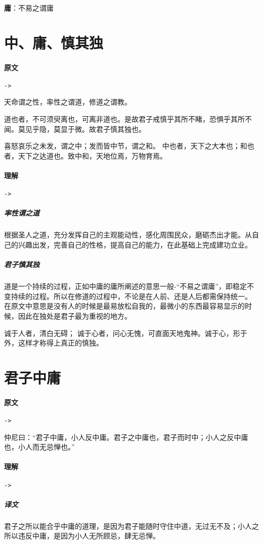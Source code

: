 \documentclass[UTF8,a4paper,8pt]{ctexbook}
\begin{document}
	\textbf{庸}：不易之谓庸
	
	\section{中、庸、慎其独}
		\paragraph{原文}\verb|->|
		
			天命谓之性，率性之谓道，修道之谓教。
			
			道也者，不可须臾离也，可离非道也。是故君子戒慎乎其所不睹，恐惧乎其所不闻。莫见乎隐，莫显于微。故君子慎其独也。
		
			喜怒哀乐之未发，谓之中；发而皆中节，谓之和。 中也者，天下之大本也；和也者，天下之达道也。致中和，天地位焉，万物育焉。
			
		\paragraph{理解}\verb|->|
			
			\subparagraph{率性谓之道} 根据圣人之道，充分发挥自己的主观能动性，感化周围民众，磨砺杰出才能。从自己的兴趣出发，完善自己的性格，提高自己的能力，在此基础上完成建功立业。
			
			\subparagraph{君子慎其独} 道是一个持续的过程，正如中庸的庸所阐述的意思一般-“不易之谓庸”，即稳定不变持续的过程。所以在修道的过程中，不论是在人前、还是人后都需保持统一。 在原文中意思是没有人的时候是最易放松自我的，最微小的东西最容易显示的时候，因此在独处是君子最为重视的地方。
			
			诚于人者，清白无碍； 诚于心者，问心无愧，可直面天地鬼神。诚于心，形于外，这样才称得上真正的慎独。
	
	\section{君子中庸}
			\paragraph{原文}\verb|->|
				
				仲尼曰：“君子中庸，小人反中庸。君子之中庸也，君子而时中；小人之反中庸也，小人而无忌惮也。”
				
			\paragraph{理解}\verb|->|
				\subparagraph{译文}君子之所以能合乎中庸的道理，是因为君子能随时守住中道，无过无不及；小人之所以违反中庸，是因为小人无所顾忌，肆无忌惮。
\end{document}
